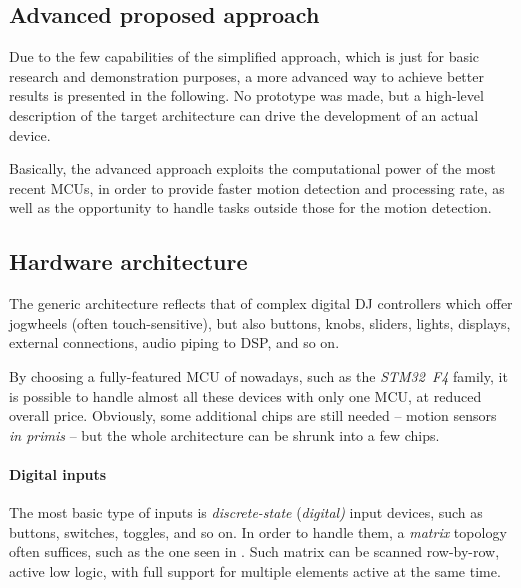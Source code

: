 \documentclass[a4paper,10pt]{article}
\begin{document}
\begin{multicols}{2}
\section{Advanced proposed approach}
\label{sec:advanced_approach}

Due to the few capabilities of the simplified approach, which is just for
basic research and demonstration purposes, a more advanced way to achieve
better results is presented in the following. No prototype was made, but a
high-level description of the target architecture can drive the development
of an actual device.

Basically, the advanced approach exploits the computational power of the most
recent MCUs, in order to provide faster motion detection and processing rate,
as well as the opportunity to handle tasks outside those for the motion
detection.

\TODO


\subsection{Hardware architecture}

The generic architecture reflects that of complex digital DJ controllers
which offer jogwheels (often touch-sensitive), but also buttons, knobs,
sliders, lights, displays, external connections, audio piping to DSP, and so
on.

By choosing a fully-featured MCU of nowadays, such as the \emph{STM32~F4}
family, it is possible to handle almost all these devices with only one MCU,
at reduced overall price. Obviously, some additional chips are still needed
-- motion sensors \emph{in primis} -- but the whole architecture can be shrunk
into a few chips.


\paragraph{Digital inputs}
The most basic type of inputs is \emph{discrete-state} (\emph{digital)} input
devices, such as buttons, switches, toggles, and so on. In order to handle
them, a \emph{matrix} topology often suffices, such as the one seen in
. Such matrix can be scanned row-by-row, active low logic,
with full support for multiple elements active at the same time.


\end{multicols}
\end{document}
